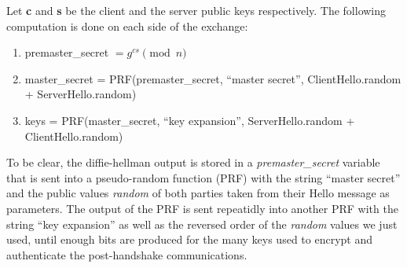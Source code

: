 \documentclass[a4paper,11pt,twocolumn]{article}
\begin{document}
\begin{center}
\end{center}


Let \textbf{c} and \textbf{s} be the client and the server public keys respectively. The following computation is done on each side of the exchange:

\begin{enumerate}
  \item premaster\_secret $ = g^{cs}\pmod{n}$
  \item master\_secret = PRF(premaster\_secret, ``master secret'', ClientHello.random + ServerHello.random)
  \item keys = PRF(master\_secret, ``key expansion'', ServerHello.random + ClientHello.random)
\end{enumerate}

To be clear, the diffie-hellman output is stored in a \emph{premaster\_secret} variable that is sent into a pseudo-random function (PRF) with the string ``master secret'' and the public values \emph{random} of both parties taken from their Hello message as parameters. The output of the PRF is sent repeatidly into another PRF with the string ``key expansion'' as well as the reversed order of the \emph{random} values we just used, until enough bits are produced for the many keys used to encrypt and authenticate the post-handshake communications.
\end{document}
